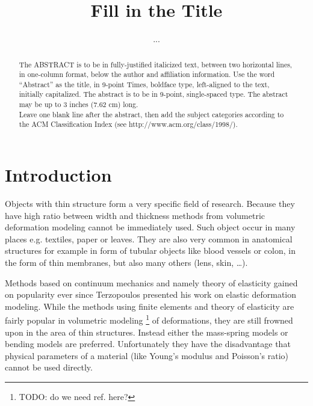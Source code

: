 \documentclass{egpubl}
\title[Short title]%
      {Fill in the Title} %
\author[...]
       {...} %
\begin{document}

\maketitle

\begin{abstract} %
   The ABSTRACT is to be in fully-justified italicized text, 
   between two horizontal lines,
   in one-column format, 
   below the author and affiliation information. 
   Use the word ``Abstract'' as the title, in 9-point Times, boldface type, 
   left-aligned to the text, initially capitalized. 
   The abstract is to be in 9-point, single-spaced type.
   The abstract may be up to 3 inches (7.62 cm) long. \\
   Leave one blank line after the abstract, 
   then add the subject categories according to the ACM Classification Index 
   (see http://www.acm.org/class/1998/).

\begin{classification} %
\end{classification}

\end{abstract}






\section{Introduction} %

Objects with thin structure form a very specific field of research. Because
they have high ratio between width and thickness methods from volumetric
deformation modeling cannot be immediately used. Such object occur in many
places e.g. textiles, paper or leaves. They are also very common in
anatomical structures for example in form of tubular objects like blood
vessels or colon, in the form of thin membranes, but also many others
(lens, skin, \ldots).

Methods based on continuum mechanics and namely theory of elasticity gained
on popularity ever since Terzopoulos \cite{Terzopoulos1987} presented his
work on elastic deformation modeling. While the methods using finite
elements and theory of elasticity are fairly popular in volumetric modeling
\footnote{TODO: do we need ref. here?} of deformations, they are still
frowned upon in the area of thin structures. Instead either the
mass-spring models \cite{Volino2009} or bending models
\cite{Grinspun2003,Choi2007} are preferred. Unfortunately they have the
disadvantage that physical parameters of a material (like Young's modulus
and Poisson's ratio) cannot be used directly.
\end{document}
